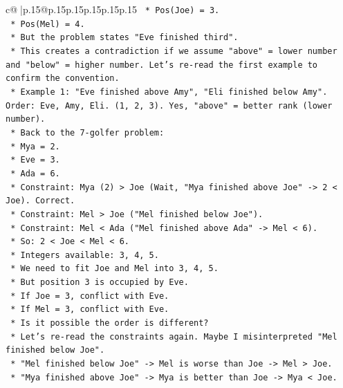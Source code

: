 \documentclass{article}
\begin{document}
{\begin{supertabular}{c@{$\;$}|p{.15\linewidth}@{}p{.15\linewidth}p{.15\linewidth}p{.15\linewidth}p{.15\linewidth}p{.15\linewidth}}
{{{\texttt{                *   Pos(Joe) = 3.} \\
\texttt{                *   Pos(Mel) = 4.} \\
\texttt{            *   But the problem states "Eve finished third".} \\
\texttt{            *   This creates a contradiction if we assume "above" = lower number and "below" = higher number. Let's re{-}read the first example to confirm the convention.} \\
\texttt{            *   Example 1: "Eve finished above Amy", "Eli finished below Amy". Order: Eve, Amy, Eli. (1, 2, 3). Yes, "above" = better rank (lower number).} \\
\texttt{            *   Back to the 7{-}golfer problem:} \\
\texttt{                *   Mya = 2.} \\
\texttt{                *   Eve = 3.} \\
\texttt{                *   Ada = 6.} \\
\texttt{                *   Constraint: Mya (2) > Joe (Wait, "Mya finished above Joe" {-}> 2 < Joe). Correct.} \\
\texttt{                *   Constraint: Mel > Joe ("Mel finished below Joe").} \\
\texttt{                *   Constraint: Mel < Ada ("Mel finished above Ada" {-}> Mel < 6).} \\
\texttt{                *   So: 2 < Joe < Mel < 6.} \\
\texttt{                *   Integers available: 3, 4, 5.} \\
\texttt{                *   We need to fit Joe and Mel into 3, 4, 5.} \\
\texttt{                *   But position 3 is occupied by Eve.} \\
\texttt{                *   If Joe = 3, conflict with Eve.} \\
\texttt{                *   If Mel = 3, conflict with Eve.} \\
\texttt{                *   Is it possible the order is different?} \\
\texttt{                *   Let's re{-}read the constraints again. Maybe I misinterpreted "Mel finished below Joe".} \\
\texttt{                *   "Mel finished below Joe" {-}> Mel is worse than Joe {-}> Mel > Joe.} \\
\texttt{                *   "Mya finished above Joe" {-}> Mya is better than Joe {-}> Mya < Joe.} \\
}}}
\end{supertabular}}
\end{document}
